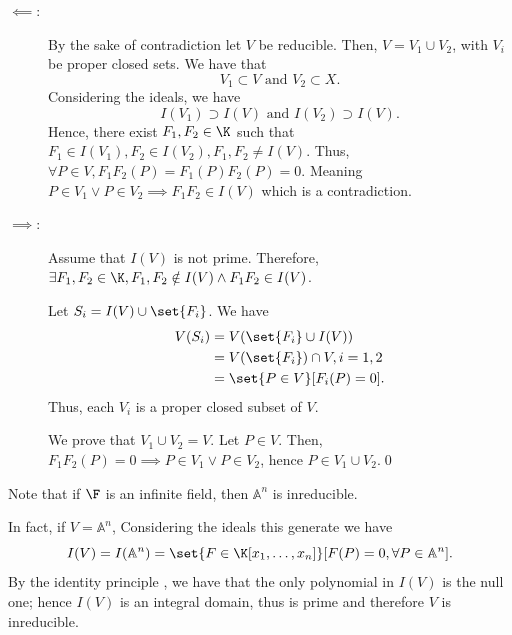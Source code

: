 \documentclass{subfiles}
\begin{document}
    \begin{proof*}
        \begin{description}
            \item [\(\impliedby \):] By the sake of contradiction let \(V\) be reducible. 
                Then, \(V = V_{1} \cup V_{2}\), with \(V_{i}\) be proper closed sets.
                We have that 
                \[
                    V_{1} \subset V \text{ and } V_{2} \subset X.
                \]
                Considering the ideals, we have 
                \[
                    I(V_{1}) \supset I(V) \text{ and } I(V_{2}) \supset I(V).
                \]
                Hence, there exist \(F_{1}, F_{2} \in \K\) such that \(F_{1} \in I(V_{1}),
                F_{2} \in I(V_{2}), F_{1}, F_{2} \ne I(V)\). Thus, 
                \(\forall P \in V, F_{1}F_{2}(P) = F_{1}(P)F_{2}(P) = 0\).
                Meaning \(P \in V_{1} \lor P \in V_{2} \implies F_{1}F_{2} \in I(V)\)
                which is a contradiction.

            \item [\(\implies\):] Assume that \(I(V)\) is not prime.
                Therefore, \(\exists F_{1}, F_{2} \in \K, F_{1},F_{2} \notin I(V) \land F_{1}F_{2} \in I(V)\).
                
                Let \(S_{i} = I(V) \cup \set{F_{i}}\). We have 
                \[\begin{aligned}
                    V(S_{i}) &= V(\set{F_{i}} \cup I(V)) \\ 
                     &= V(\set{F_{i}}) \cap V, i = 1, 2 \\ 
                     &= \set{P \in V}[F_{i}(P) = 0].
                \end{aligned}\]
                Thus, each \(V_{i}\) is a proper closed subset of \(V\).

            We prove that \(V_{1} \cup V_{2} = V\). Let \(P \in V\).
                Then, \(F_{1}F_{2}(P) = 0 \implies P \in V_{1} \lor P \in V_{2}\),
                hence \(P \in V_{1} \cup V_{2}\).\qed
        \end{description}
    \end{proof*}

    \begin{remark*}
        Note that if \(\F\) is an infinite field, then \(\mathbb{A}^{n}\) is inreducible.

        In fact, if \(V = \mathbb{A}^{n}\), Considering the ideals this generate we have 
        \[
            I(V) = I(\mathbb{A}^{n}) = \set{F \in \K[x_{1}, \ldots, x_{n}]}[F(P) = 0, \forall P \in \mathbb{A}^{n}].
        \]
        By the identity principle , we have that the only
        polynomial in \(I(V)\) is the null one; hence \(I(V)\)  is an integral domain,
        thus is prime and therefore \(V\) is inreducible.
    \end{remark*}
\end{document}
